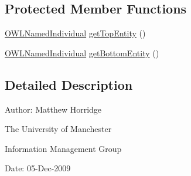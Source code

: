 \subsection*{Protected Member Functions}
\begin{DoxyCompactItemize}
\item 
\hyperlink{interfaceorg_1_1semanticweb_1_1owlapi_1_1model_1_1_o_w_l_named_individual}{O\-W\-L\-Named\-Individual} \hyperlink{classorg_1_1semanticweb_1_1owlapi_1_1reasoner_1_1impl_1_1_o_w_l_named_individual_node_ad8f6f368fdadf2b5506352c96607b34d}{get\-Top\-Entity} ()
\item 
\hyperlink{interfaceorg_1_1semanticweb_1_1owlapi_1_1model_1_1_o_w_l_named_individual}{O\-W\-L\-Named\-Individual} \hyperlink{classorg_1_1semanticweb_1_1owlapi_1_1reasoner_1_1impl_1_1_o_w_l_named_individual_node_a33f930450709b5a91abf6b9fd22fac4b}{get\-Bottom\-Entity} ()
\end{DoxyCompactItemize}


\subsection{Detailed Description}
Author\-: Matthew Horridge\par
 The University of Manchester\par
 Information Management Group\par
 Date\-: 05-\/\-Dec-\/2009 

